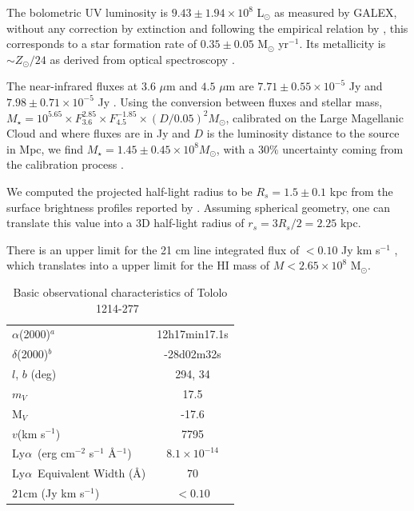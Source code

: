 \documentclass[a4,useAMS,usenatbib,usegraphicx]{mn2e}
\newcommand{\tol}{Tololo 1214-277}
\newcommand{\lya}{Ly$\alpha$}
\begin{document}
The bolometric UV luminosity is $9.43\pm1.94 \times 10^{8}$
L$_{\odot}$ as measured by GALEX, without any correction by extinction
and following the empirical relation by \cite{Kennicutt98}, this
corresponds to a star formation rate of $0.35\pm 0.05$ M$_{\odot}$
yr$^{-1}$. 
Its metallicity is $\sim Z_{\odot}/24$ as derived from
optical spectroscopy \citep{Izotov04}. 

%


The near-infrared fluxes at $3.6$ $\mu$m and $4.5$ $\mu$m are
$7.71\pm0.55\times 10^{-5}$ Jy and $7.98\pm0.71\times 10^{-5}$ Jy
\citep{2008ApJ...678..804E}.
Using the conversion between fluxes and
stellar mass, $M_{\star} =
10^{5.65} \times F_{3.6}^{2.85} \times F_{4.5}^{-1.85} \times
(D/0.05)^2 M_{\odot}$,  calibrated on the Large Magellanic Cloud 
and  where fluxes are in Jy and $D$ is the luminosity
distance to the source in Mpc, we find $M_{\star} = 1.45\pm0.45\times 10^{8}
M_{\odot}$, with a $30\%$ uncertainty coming from the calibration
process \citep{2012AJ....143..139E}.  

We computed the projected half-light radius to be $R_s=1.5\pm0.1$ kpc 
from the surface brightness profiles reported by \cite{2003A&A...410..481N}. 
Assuming spherical geometry, one can translate this value into a 3D
half-light radius of $r_s=3R_s/2=2.25$ kpc.

There is an upper limit for the  21 cm line integrated flux of $<0.10$
Jy km s$^{-1}$ \citep{pustilnikmartin07}, which translates into a
upper limit for the HI mass of $M<2.65\times 10^{8}$ M$_{\odot}$.  
 



\begin{table}
\begin{center}
\begin{tabular}{lc}\hline
$\alpha$(2000)$^{a}$ & 12h17min17.1s\\
$\delta$(2000)$^{b}$ & -28d02m32s\\
$l$, $b$ (deg) & 294, 34\\
$m_V$ & 17.5\\
  M$_V$ & -17.6\\ 
$v$(km s$^{-1}$) & 7795\\
\lya\ (erg cm$^{-2}$ s$^{-1}$ \AA$^{-1}$)& $8.1\times 10^{-14}$ \\
\lya\ Equivalent Width (\AA) & $70$\\
$21$cm (Jy km s$^{-1}$)& $<0.10$ \\\hline
\end{tabular}
\end{center}
\caption{Basic observational characteristics of \tol\ 
  \citep{Thuan97}\label{obstable}} 
\end{table}
\end{document}

